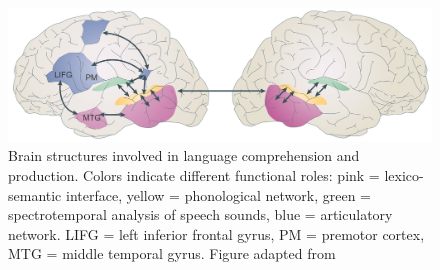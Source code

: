 \begin{figure}[!ht]
	\centering
	\includegraphics[width=.9\textwidth, clip=true]{./Chapters/01_Introduction/Images_MM/Language_network}
	\caption{Brain structures involved in language comprehension and production. Colors indicate different functional roles: pink = lexico-semantic interface, yellow = phonological network, green = spectrotemporal analysis of speech sounds, blue = articulatory network. LIFG = left inferior frontal gyrus, PM = premotor cortex, MTG = middle temporal gyrus. Figure adapted from \citet{hickok2007}}
    \vspace*{-10pt}
	\label{fig:language}
\end{figure}